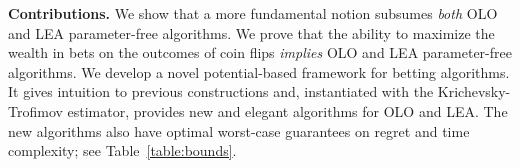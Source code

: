 

\textbf{Contributions.} We show that a more fundamental notion subsumes
\emph{both} \ac{OLO} and \ac{LEA} parameter-free algorithms. We prove that the
ability to maximize the wealth in bets on the outcomes of coin flips
\emph{implies} \ac{OLO} and \ac{LEA} parameter-free algorithms. We develop a
novel potential-based framework for betting algorithms. It gives intuition to
previous constructions and, instantiated with the Krichevsky-Trofimov
estimator, provides new and elegant algorithms for \ac{OLO} and \ac{LEA}.  The
new algorithms also have optimal worst-case guarantees on regret and time
complexity; see Table~\ref{table:bounds}.
